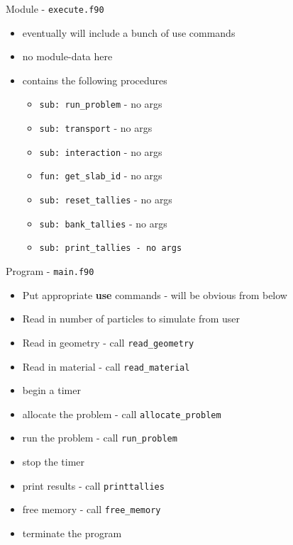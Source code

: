 \documentclass{beamer}
\begin{document}
\begin{frame}{Module - \texttt{execute.f90}}

  \begin{itemize}
    \item eventually will include a bunch of use commands
    \vfill\item no module-data here
    \vfill\item contains the following procedures
    \begin{itemize}
      \item \texttt{sub: run\_problem} - no args
      \item \texttt{sub: transport} - no args
      \item \texttt{sub: interaction} - no args
      \item \texttt{fun: get\_slab\_id} - no args
      \item \texttt{sub: reset\_tallies} - no args
      \item \texttt{sub: bank\_tallies} - no args
      \item \texttt{sub: print\_tallies - no args}
    \end{itemize}
  \end{itemize}

\end{frame}
\begin{frame}{Program - \texttt{main.f90}}

  \begin{itemize}
    \item Put appropriate \textbf{use} commands - will be obvious from below
    \vfill\item Read in number of particles to simulate from user
    \vfill\item Read in geometry - call \texttt{read\_geometry}
    \vfill\item Read in material - call \texttt{read\_material}
    \vfill\item begin a timer
    \vfill\item allocate the problem - call \texttt{allocate\_problem}
    \vfill\item run the problem - call \texttt{run\_problem}
    \vfill\item stop the timer
    \vfill\item print results - call \texttt{printtallies}
    \vfill\item free memory - call \texttt{free\_memory}
    \vfill\item terminate the program
  \end{itemize}

\end{frame}
\end{document}

